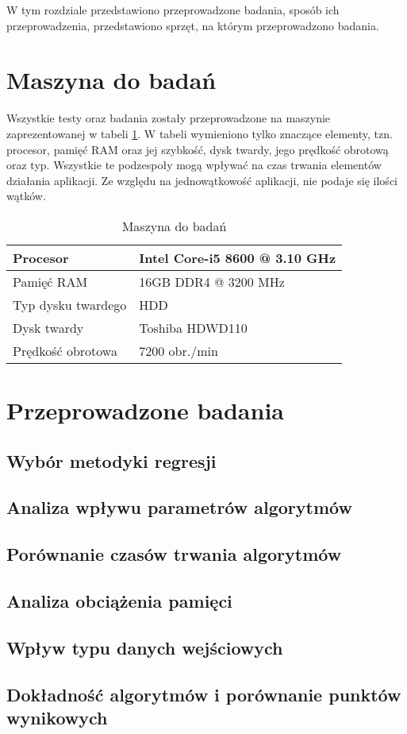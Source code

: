 W tym rozdziale przedstawiono przeprowadzone badania, sposób ich przeprowadzenia, przedstawiono sprzęt, na którym przeprowadzono badania.
\section{Maszyna do badań}
Wszystkie testy oraz badania zostały przeprowadzone na maszynie zaprezentowanej w tabeli \ref{tab:machine}. W tabeli wymieniono tylko znaczące elementy, tzn. procesor, pamięć RAM oraz jej szybkość, dysk twardy, jego prędkość obrotową oraz typ. Wszystkie te podzespoły mogą wpływać na czas trwania elementów działania aplikacji. Ze względu na jednowątkowość aplikacji, nie podaje się ilości wątków.
\begin{table}[H]
    \centering
    \begin{tabular}{|l|l|}
    \hline
    Procesor       & Intel Core-i5 8600 @ 3.10 GHz          \\ \hline
    Pamięć RAM     & 16GB DDR4 @ 3200 MHz \\ \hline
    Typ dysku twardego           & HDD              \\ \hline
    Dysk twardy         & Toshiba HDWD110              \\ \hline
    Prędkość obrotowa         & 7200 obr./min              \\ \hline
    \end{tabular}
    \caption{Maszyna do badań}
    \label{tab:machine}
\end{table}
\section{Przeprowadzone badania}
\subsection{Wybór metodyki regresji}
\label{ssec:regression}
\subsection{Analiza wpływu parametrów algorytmów}
\label{ssec:queryparameters}
\subsection{Porównanie czasów trwania algorytmów}
\label{ssec:times}
\subsection{Analiza obciążenia pamięci}
\label{ssec:memory}
\subsection{Wpływ typu danych wejściowych}
\label{ssec:entrydata}
\subsection{Dokładność algorytmów i porównanie punktów wynikowych}